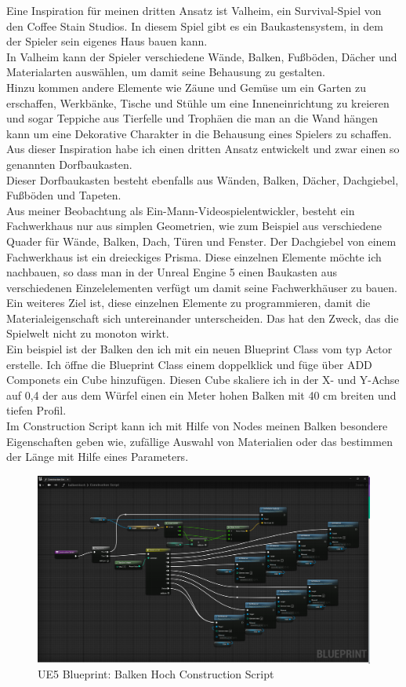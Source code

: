 Eine Inspiration für meinen dritten Ansatz ist Valheim, ein Survival-Spiel von den Coffee Stain Studios. In diesem Spiel gibt es ein Baukastensystem, in dem der Spieler sein eigenes Haus bauen kann.
\\
In Valheim kann der Spieler verschiedene Wände, Balken, Fußböden, Dächer und Materialarten auswählen, um damit seine Behausung zu gestalten.
\\
Hinzu kommen andere Elemente wie Zäune und Gemüse um ein Garten zu erschaffen, Werkbänke, Tische und Stühle um eine Inneneinrichtung zu kreieren und sogar Teppiche aus Tierfelle und Trophäen die man an die Wand hängen kann um eine Dekorative Charakter in die Behausung eines Spielers zu schaffen.
\\
Aus dieser Inspiration habe ich einen dritten Ansatz entwickelt und zwar einen so genannten Dorfbaukasten.
\\
Dieser Dorfbaukasten besteht ebenfalls aus Wänden, Balken, Dächer, Dachgiebel, Fußböden und Tapeten.
\\
Aus meiner Beobachtung als Ein-Mann-Videospielentwickler, besteht ein Fachwerkhaus nur aus simplen Geometrien, wie zum Beispiel aus verschiedene Quader für Wände, Balken, Dach, Türen und Fenster. Der Dachgiebel von einem Fachwerkhaus ist ein dreieckiges Prisma. Diese einzelnen Elemente möchte ich nachbauen, so dass man in der Unreal Engine 5 einen Baukasten aus verschiedenen Einzelelementen verfügt um damit seine Fachwerkhäuser zu bauen. 
\\
Ein weiteres Ziel ist, diese einzelnen Elemente zu programmieren, damit die Materialeigenschaft sich untereinander unterscheiden. Das hat den Zweck, das die Spielwelt nicht zu monoton wirkt.
\\
Ein beispiel ist der Balken den ich mit ein neuen Blueprint Class vom typ Actor erstelle. Ich öffne die Blueprint Class einem doppelklick und füge über ADD Componets ein Cube hinzufügen. Diesen Cube skaliere ich in der X- und Y-Achse auf 0,4 der aus dem Würfel einen ein Meter hohen Balken mit 40 cm breiten und tiefen Profil.
\\
Im Construction Script kann ich mit Hilfe von Nodes meinen Balken besondere Eigenschaften geben wie, zufällige Auswahl von Materialien oder das bestimmen der Länge mit Hilfe eines Parameters.
\\
\begin{figure}
	\includegraphics[width=14cm]{BilderFuerBA/balkenHochBP.png}
	\caption{UE5 Blueprint: Balken Hoch Construction Script}
	\label{UE5balkenHochBP}
\end{figure}
